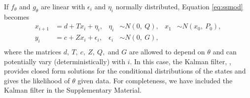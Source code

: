 \documentclass[12pt]{article}
\DeclareRobustCommand{\varx}{{\mathpalette\irchi\relax}}
\newcommand{\irchi}[2]{\protect\raisebox{\depth}{$#1\upchi$}}
\begin{document}
If $f_\theta$ and $g_\theta$ are linear with $\epsilon_i$ and
$\eta_i$ normally distributed, Equation \eqref{eq:ssmod} becomes
\begin{equation}
  \begin{aligned}
    x_{i+1}&= d+T x_i + \eta_{i}, 
    & \eta_i &\sim N(0,\ Q),     
    &x_1 &\sim N(x_0,\ P_0),\\
    y_i&= c + Z x_i + \epsilon_i,     
    & \epsilon_i &\sim N(0,\ G), \\
  \end{aligned}
  \label{eq:lgmod}
\end{equation}
where the matrices $d,\ T,\ c,\ Z,\ Q,$ and $G$ are allowed to depend
on $\theta$ and can potentially vary (deterministically) with $i$. In this case,
the Kalman filter, %
\citep[see e.g.,][]{Kalman1960,Harvey1990},
provides closed form 
solutions for the conditional
distributions of the states and gives the likelihood of $\theta$
given data. For completeness, we have included the Kalman filter in
the Supplementary Material.%
\end{document}
